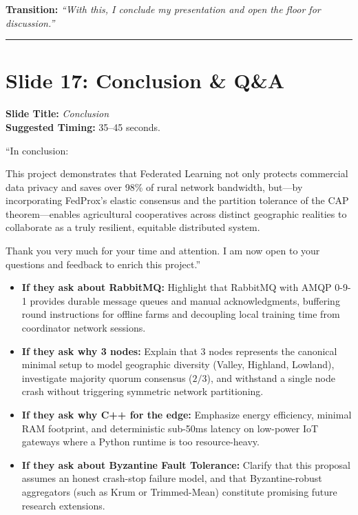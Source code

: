 \documentclass[11pt,a4paper]{article}
\begin{document}
\textbf{Transition:} \textit{``With this, I conclude my presentation and open the floor for discussion.''}

\vspace{0.35cm}\hrule\vspace{0.35cm}

\section{Slide 17: Conclusion \& Q\&A}
\textbf{Slide Title:} \textit{Conclusion} \\
\textbf{Suggested Timing:} 35--45 seconds.

\begin{tcolorbox}[colframe=primaryblue, title=\textbf{Strong Closing and Opening for Questions (Literal Script)}]
``In conclusion:

This project demonstrates that Federated Learning not only protects commercial data privacy and saves over 98\% of rural network bandwidth, but---by incorporating FedProx's elastic consensus and the partition tolerance of the CAP theorem---enables agricultural cooperatives across distinct geographic realities to collaborate as a truly resilient, equitable distributed system.

Thank you very much for your time and attention. I am now open to your questions and feedback to enrich this project.''
\end{tcolorbox}

\vspace{0.6cm}
\begin{tcolorbox}[colframe=accentorange, title=\textbf{Tips for the Q\&A Session}]
\begin{itemize}[leftmargin=*]
    \item \textbf{If they ask about RabbitMQ:} Highlight that RabbitMQ with AMQP 0-9-1 provides durable message queues and manual acknowledgments, buffering round instructions for offline farms and decoupling local training time from coordinator network sessions.
    \item \textbf{If they ask why 3 nodes:} Explain that 3 nodes represents the canonical minimal setup to model geographic diversity (Valley, Highland, Lowland), investigate majority quorum consensus ($2/3$), and withstand a single node crash without triggering symmetric network partitioning.
    \item \textbf{If they ask why C++ for the edge:} Emphasize energy efficiency, minimal RAM footprint, and deterministic sub-50ms latency on low-power IoT gateways where a Python runtime is too resource-heavy.
    \item \textbf{If they ask about Byzantine Fault Tolerance:} Clarify that this proposal assumes an honest crash-stop failure model, and that Byzantine-robust aggregators (such as Krum or Trimmed-Mean) constitute promising future research extensions.
\end{itemize}
\end{tcolorbox}
\end{document}
